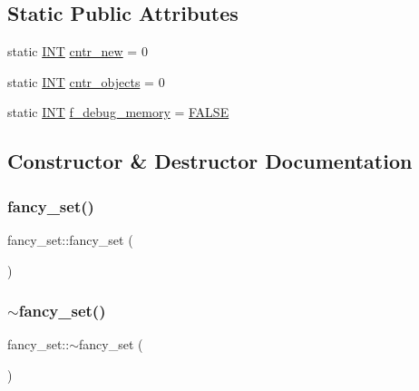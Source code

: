\subsection*{Static Public Attributes}
\begin{DoxyCompactItemize}
\item 
static \mbox{\hyperlink{galois_8h_a09fddde158a3a20bd2dcadb609de11dc}{I\+NT}} \mbox{\hyperlink{classfancy__set_a6770248166448a9c0bad3d85c071e9ad}{cntr\+\_\+new}} = 0
\item 
static \mbox{\hyperlink{galois_8h_a09fddde158a3a20bd2dcadb609de11dc}{I\+NT}} \mbox{\hyperlink{classfancy__set_a5ef2964e300c5cb3780541ec58750073}{cntr\+\_\+objects}} = 0
\item 
static \mbox{\hyperlink{galois_8h_a09fddde158a3a20bd2dcadb609de11dc}{I\+NT}} \mbox{\hyperlink{classfancy__set_a018eb365a4f57d22f88e759bea678030}{f\+\_\+debug\+\_\+memory}} = \mbox{\hyperlink{nauty_8h_aa93f0eb578d23995850d61f7d61c55c1}{F\+A\+L\+SE}}
\end{DoxyCompactItemize}


\subsection{Constructor \& Destructor Documentation}
\mbox{\label{classfancy__set_a636dcf13f334a3e0aa9e94b04a155600}} 
\subsubsection{\texorpdfstring{fancy\+\_\+set()}{fancy\_set()}}
{\footnotesize\ttfamily fancy\+\_\+set\+::fancy\+\_\+set (\begin{DoxyParamCaption}{ }\end{DoxyParamCaption})}

\mbox{\label{classfancy__set_a9ed093ccc0c2a48d66d2ee80ade0122a}} 
\subsubsection{\texorpdfstring{$\sim$fancy\+\_\+set()}{~fancy\_set()}}
{\footnotesize\ttfamily fancy\+\_\+set\+::$\sim$fancy\+\_\+set (\begin{DoxyParamCaption}{ }\end{DoxyParamCaption})}



